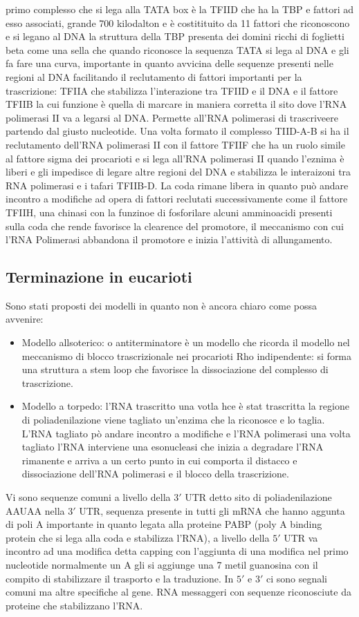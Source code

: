 primo complesso che si lega alla TATA box \`e la TFIID che ha la TBP e fattori ad esso associati, grande 700 kilodalton e \`e costitituito da 11 fattori che riconoscono e si legano al 
DNA la struttura della TBP presenta dei domini ricchi di foglietti beta come una sella che quando riconosce la sequenza TATA si lega al DNA e gli fa fare una curva, importante in quanto
avvicina delle sequenze presenti nelle regioni al DNA facilitando il reclutamento di fattori importanti per la trascrizione: TFIIA che stabilizza l'interazione tra TFIID e il DNA e il 
fattore TFIIB la cui funzione \`e quella di marcare in maniera corretta il sito dove l'RNA polimerasi II va a legarsi al DNA. Permette all'RNA polimerasi di trascriveere partendo dal 
giusto nucleotide. Una volta formato il complesso TIID-A-B si ha il reclutamento dell'RNA polimerasi II con il fattore TFIIF che ha un ruolo simile al fattore sigma dei procarioti e si 
lega all'RNA polimerasi II quando l'eznima \`e liberi e gli impedisce di legare altre regioni del DNA e stabilizza le interaizoni tra RNA polimerasi e i tafari TFIIB-D. La coda rimane 
libera in quanto pu\`o andare incontro a modifiche ad opera di fattori reclutati successivamente come il fattore TFIIH, una chinasi con la funzinoe di fosforilare alcuni amminoacidi 
presenti sulla coda che rende favorisce la clearence del promotore, il meccanismo con cui l'RNA Polimerasi abbandona il promotore e inizia l'attivit\`a di allungamento. 
\subsection{Terminazione in eucarioti}
Sono stati proposti dei modelli in quanto non \`e ancora chiaro come possa avvenire:
\begin{itemize}
	\item Modello allsoterico: o antiterminatore \`e un modello che ricorda il modello nel meccanismo di blocco trascrizionale nei procarioti Rho indipendente: si forma una 
		struttura a stem loop che favorisce la dissociazione del complesso di trascrizione.
	\item Modello a torpedo: l'RNA trascritto una votla hce \`e stat trascritta la regione di poliadenilazione viene tagliato un'enzima che la riconosce e lo taglia. L'RNA tagliato 
		p\`o andare incontro a modifiche e l'RNA polimerasi una volta tagliato l'RNA interviene una esonucleasi che inizia a degradare l'RNA rimanente e arriva a un certo punto
		in cui comporta il distacco e dissociazione dell'RNA polimerasi e il blocco della trascrizione.
\end{itemize}
Vi sono sequenze comuni a livello della $3'$ UTR detto sito di poliadenilazione AAUAA nella $3'$ UTR, sequenza presente in tutti gli mRNA che hanno aggunta di poli A importante in 
quanto legata alla proteine PABP (poly A binding protein che si lega alla coda e stabilizza l'RNA), a livello della $5'$ UTR va incontro ad una modifica detta capping con l'aggiunta
di una modifica nel primo nucleotide normalmente un A gli si aggiunge una 7 metil guanosina con il compito di stabilizzare il trasporto e la traduzione. In $5'$ e $3'$ ci sono segnali
comuni ma altre specifiche al gene. RNA messaggeri con sequenze riconosciute da proteine che stabilizzano l'RNA. 


